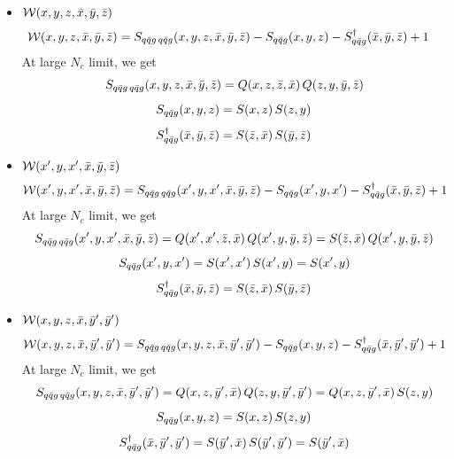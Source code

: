 \documentclass[9pt]{article}
\numberwithin{equation}{section}
\begin{document}
\begin{itemize}
    \item $\mathcal{W}(x,y,z,\Bar{x},\Bar{y},\Bar{z})$
    \begin{align}
        \mathcal{W}(x,y,z,\Bar{x},\Bar{y},\Bar{z}) & = S_{q\Bar{q}g\,q\Bar{q}g}(x,y,z,\Bar{x},\Bar{y},\Bar{z}) -S_{q\Bar{q}g}(x,y,z) - S^{\dagger}_{q\Bar{q}g}(\Bar{x},\Bar{y},\Bar{z}) + 1
    \end{align}
At large $N_{c}$ limit, we get
$$S_{q\Bar{q}g\,q\Bar{q}g}(x,y,z,\Bar{x},\Bar{y},\Bar{z}) = Q(x,z,\Bar{z},\Bar{x})\, Q(z,y,\Bar{y},\Bar{z})$$
$$S_{q\Bar{q}g}(x,y,z) = S(x,z)\, S(z,y)$$
$$S^{\dagger}_{q\Bar{q}g}(\Bar{x},\Bar{y},\Bar{z}) = S(\Bar{z},\Bar{x})\, S(\Bar{y},\Bar{z})$$
\item $\mathcal{W}(x',y,x',\Bar{x},\Bar{y},\Bar{z})$
\begin{align}
        \mathcal{W}(x',y,x',\Bar{x},\Bar{y},\Bar{z}) & = S_{q\Bar{q}g\,q\Bar{q}g}(x',y,x',\Bar{x},\Bar{y},\Bar{z}) -S_{q\Bar{q}g}(x',y,x') - S^{\dagger}_{q\Bar{q}g}(\Bar{x},\Bar{y},\Bar{z}) + 1
    \end{align}
At large $N_{c}$ limit, we get
$$S_{q\Bar{q}g\,q\Bar{q}g}(x',y,x',\Bar{x},\Bar{y},\Bar{z}) = Q(x',x',\Bar{z},\Bar{x})\, Q(x',y,\Bar{y},\Bar{z}) = S(\Bar{z},\Bar{x})\,Q(x',y,\Bar{y},\Bar{z})$$
$$S_{q\Bar{q}g}(x',y,x') = S(x',x')\, S(x',y) = S(x',y) $$
$$S^{\dagger}_{q\Bar{q}g}(\Bar{x},\Bar{y},\Bar{z}) = S(\Bar{z},\Bar{x})\, S(\Bar{y},\Bar{z})$$
\item $\mathcal{W}(x,y,z,\Bar{x},\Bar{y}',\Bar{y}')$
\begin{align}
        \mathcal{W}(x,y,z,\Bar{x},\Bar{y}',\Bar{y}') & = S_{q\Bar{q}g\,q\Bar{q}g}(x,y,z,\Bar{x},\Bar{y}',\Bar{y}') -S_{q\Bar{q}g}(x,y,z) - S^{\dagger}_{q\Bar{q}g}(\Bar{x},\Bar{y}',\Bar{y}') + 1
    \end{align}
At large $N_{c}$ limit, we get
$$S_{q\Bar{q}g\,q\Bar{q}g}(x,y,z,\Bar{x},\Bar{y}',\Bar{y}') = Q(x,z,\Bar{y}',\Bar{x})\, Q(z,y,\Bar{y}',\Bar{y}') = Q(x,z,\Bar{y}',\Bar{x})\, S(z,y) $$
$$S_{q\Bar{q}g}(x,y,z) = S(x,z)\, S(z,y)$$
$$S^{\dagger}_{q\Bar{q}g}(\Bar{x},\Bar{y}',\Bar{y}') = S(\Bar{y}',\Bar{x})\, S(\Bar{y}',\Bar{y}') = S(\Bar{y}',\Bar{x})$$

\end{itemize}
\end{document}
